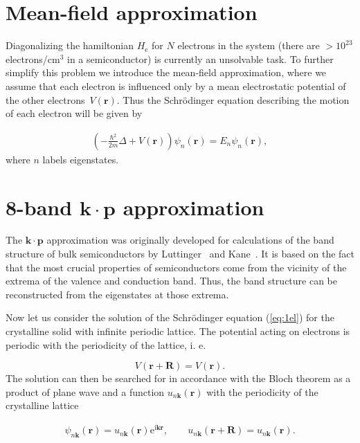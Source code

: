 \section{Mean-field approximation}
Diagonalizing the hamiltonian $H_\mathrm{e}$ for $N$ electrons in the system (there are $>10^{23}$ electrons/cm$^3$ in a semiconductor) is currently an unsolvable task. To further simplify this problem we introduce the mean-field approximation, where we assume that each electron is influenced only by a mean electrostatic potential of the other electrons~$V\left(\mathbf{r}\right)$. Thus the Schrödinger equation describing the motion of each electron will be given by

\begin{eqnarray}
\left( -\frac{\hbar^2}{2m}\Delta +V\left( \mathbf{r}\right) \right) \psi_n\left(\mathbf{r}\right) = E_n \psi_n\left(\mathbf{r}\right), \label{eq:1el}
\end{eqnarray}
where $n$ labels eigenstates.


\section{8-band $\mathbf{k\cdot p}$ approximation}
\label{theor8kp}

The $\mathbf{k\cdot p}$ approximation was originally developed for calculations of the band structure of bulk semiconductors by Luttinger~\citep{Lutt} and Kane~\citep{Kane}. It is based on the fact that the most crucial properties of semiconductors come from the vicinity of the extrema of the valence and conduction band. Thus, the band structure can be reconstructed from the eigenstates at those extrema.

Now let us consider the solution of the Schrödinger equation (\ref{eq:1el}) for the crystalline solid with infinite periodic lattice. The potential acting on electrons is periodic with the periodicity of the lattice, i. e.

\begin{equation}
V(\mathbf{r}+\mathbf{R})=V(\mathbf{r}).
\end{equation}
The solution can then be searched for in accordance with the Bloch theorem as a product of plane wave and a function $u_{n\mathbf{k}}(\mathbf{r})$ with the periodicity of the crystalline lattice

\begin{eqnarray}
\psi_{n\mathbf{k}}\left( \mathbf{r} \right) = u_{n\mathbf{k}}\left(\mathbf{r}\right) \mathrm{e}^{\mathrm{i} \mathbf{k}\mathbf{r}}, \qquad u_{n\mathbf{k}}\left(\mathbf{r+R} \right) = u_{n\mathbf{k}}\left(\mathbf{r}\right).\label{eq:Bloch}
\end{eqnarray} 

